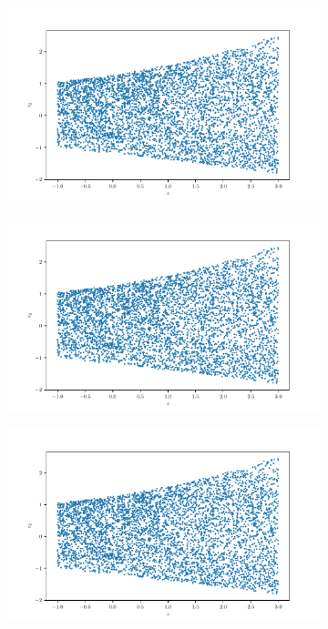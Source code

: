 \documentclass[10pt,a4paper]{article}
\begin{document}
\begin{figure}[!ht]
\begin{subfigure}{0.3\textwidth}
        \caption{}
        \label{fig_yz2}
    \end{subfigure}
    \begin{subfigure}{0.3\textwidth}
        \centering
        \includegraphics[width=\textwidth] {square_z_z2.pdf}
        \caption{}
        \label{fig_zzo}
    \end{subfigure}
    \begin{subfigure}{0.3\textwidth}
        \centering	
        \includegraphics[width=\textwidth]{square_z_z2.pdf}
        \caption{}
        \label{fig_zz1}
    \end{subfigure}
    \begin{subfigure}{0.3\textwidth}
        \centering	
        \includegraphics[width=\textwidth]{square_z_z2.pdf}

\end{subfigure}
\end{figure}
\end{document}
